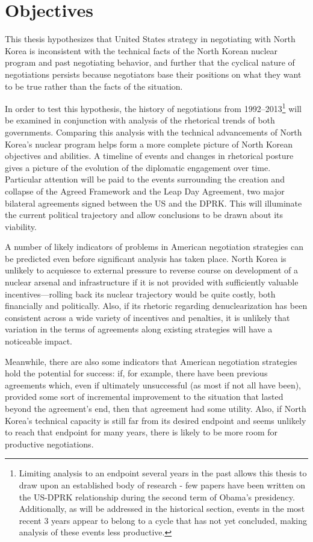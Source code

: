 \section{Objectives}

This thesis hypothesizes that United States strategy in negotiating with North Korea is inconsistent with the technical facts of the North Korean nuclear program and past negotiating behavior, and further that the cyclical nature of negotiations persists because negotiators base their positions on what they want to be true rather than the facts of the situation. 

In order to test this hypothesis, the history of negotiations from 1992--2013\footnote{Limiting analysis to an endpoint several years in the past allows this thesis to draw upon an established body of research - few papers have been written on the US-DPRK relationship during the second term of Obama's presidency. Additionally, as will be addressed in the historical section, events in the most recent 3 years appear to belong to a cycle that has not yet concluded, making analysis of these events less productive.} will be examined in conjunction with analysis of the rhetorical trends of both governments. Comparing this analysis with the technical advancements of North Korea's nuclear program helps form a more complete picture of North Korean objectives and abilities. A timeline of events and changes in rhetorical posture gives a picture of the evolution of the diplomatic engagement over time. Particular attention will be paid to the events surrounding the creation and collapse of the Agreed Framework and the Leap Day Agreement, two major bilateral agreements signed between the US and the DPRK. This will illuminate the current political trajectory and allow conclusions to be drawn about its viability.

A number of likely indicators of problems in American negotiation strategies can be predicted even before significant analysis has taken place. North Korea is unlikely to acquiesce to external pressure to reverse course on development of a nuclear arsenal and infrastructure if it is not provided with sufficiently valuable incentives---rolling back its nuclear trajectory would be quite costly, both financially and politically. Also, if its rhetoric regarding denuclearization has been consistent across a wide variety of incentives and penalties, it is unlikely that variation in the terms of agreements along existing strategies will have a noticeable impact.

Meanwhile, there are also some indicators that American negotiation strategies hold the potential for success: if, for example, there have been previous agreements which, even if ultimately unsuccessful (as most if not all have been), provided some sort of incremental improvement to the situation that lasted beyond the agreement's end, then that agreement had some utility. Also, if North Korea's technical capacity is still far from its desired endpoint and seems unlikely to reach that endpoint for many years, there is likely to be more room for productive negotiations.



